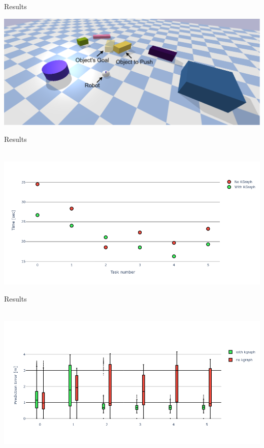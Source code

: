 \begin{frame}[fragile]{Results} 
\begin{center}
   \includegraphics[width=1.0\textwidth]{figures/results/random_1.drawio}
\end{center}
\end{frame}


\begin{frame}[fragile]{Results} 
\begin{center}
  \hbox{\hspace{-0.7cm} \includegraphics[width=1.1\textwidth]{figures/results/random_push_time_vs}}
\end{center}
\end{frame}



\begin{frame}[fragile]{Results} 
\begin{center}
  \hbox{\hspace{-0.05\textwidth} \includegraphics[width=1.1\textwidth]{figures/results/random_push_pe_vs}}
\end{center}
\end{frame}



